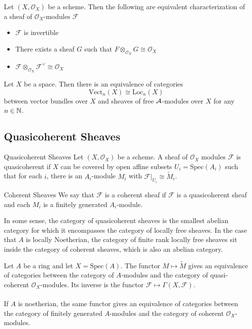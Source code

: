 \documentclass[a4paper]{article}
\begin{document}
\begin{thm}{}{} Let $(X,\mathcal{O}_X)$ be a scheme. Then the following are equivalent characterization of a sheaf of $\mathcal{O}_X$-modules $\mathcal{F}$
\begin{itemize}
\item $\mathcal{F}$ is invertible
\item There exists a sheaf $G$ such that $F\otimes_{\mathcal{O}_X}G\cong\mathcal{O}_X$
\item $\mathcal{F}\otimes_{\mathcal{O}_X}\mathcal{F}^{\vee}\cong\mathcal{O}_X$
\end{itemize}
\end{thm}

\begin{thm}{}{} Let $X$ be a space. Then there is an equivalence of categories $$\text{Vect}_n(X)\cong\text{Loc}_n(X)$$ between vector bundles over $X$ and sheaves of free $\mathcal{A}$-modules over $X$ for any $n\in\mathbb{N}$. 
\end{thm}

\subsection{Quasicoherent Sheaves}
\begin{defn}{Quasicoherent Sheaves}{} Let $(X,\mathcal{O}_X)$ be a scheme. A sheaf of $\mathcal{O}_X$ modules $\mathcal{F}$ is quasicoherent if $X$ can be covered by open affine subsets $U_i=\text{Spec}(A_i)$ such that for each $i$, there is an $A_i$-module $M_i$ with $\mathcal{F}|_{U_i}\cong\tilde{M}_i$. 
\end{defn}

\begin{defn}{Coherent Sheaves}{} We say that $\mathcal{F}$ is a coherent sheaf if $\mathcal{F}$ is a quasicoherent sheaf and each $M_i$ is a finitely generated $A_i$-module. 
\end{defn}

In some sense, the category of quasicoherent sheaves is the smallest abelian category for which it encompasses the category of locally free sheaves. In the case that $A$ is locally Noetherian, the category of finite rank locally free sheaves sit inside the category of coherent sheaves, which is also an abelian category. 

\begin{prp}{}{} Let $A$ be a ring and let $X=\text{Spec}(A)$. The functor $M\mapsto\tilde{M}$ gives an equivalence of categories between the category of $A$-modules and the category of quasi-coherent $\mathcal{O}_X$-modules. Its inverse is the functor $\mathcal{F}\mapsto\Gamma(X,\mathcal{F})$. \\~\\
If $A$ is noetherian, the same functor gives an equivalence of categories between the category of finitely generated $A$-modules and the category of coherent $\mathcal{O}_X$-modules. 
\end{prp}
\end{document}
